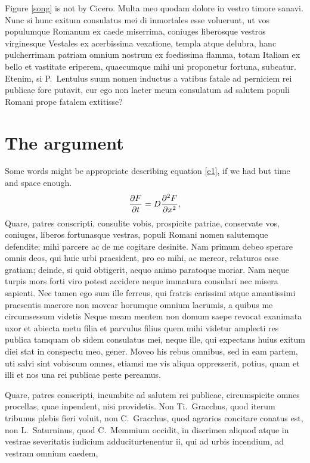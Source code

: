 \documentclass{ifacmtg}
\begin{document}
Figure \ref{song} is not by Cicero.
Multa meo quodam dolore in vestro timore sanavi. Nunc si hunc exitum
consulatus mei di inmortales esse voluerunt, ut vos populumque Romanum
ex caede miserrima, coniuges liberosque vestros virginesque Vestales ex
acerbissima vexatione, templa atque delubra, hanc pulcherrimam patriam
omnium nostrum ex foedissima flamma, totam Italiam ex bello et vastitate
eriperem, quaecumque mihi uni proponetur fortuna, subeatur. Etenim, si
P.~Lentulus suum nomen inductus a vatibus fatale ad perniciem rei
publicae fore putavit, cur ego non laeter meum consulatum ad salutem
populi Romani prope fatalem extitisse?


\section{The argument}
Some words might be appropriate describing equation \ref{e1}, if we
had but time and space enough.
\begin{equation}
{{\partial F}\over {\partial
t}}=D{{\partial^2 F}\over {\partial x^2}},
\label{e1}
\end{equation}
Quare, patres conscripti, consulite vobis, prospicite patriae,
conservate vos, coniuges, liberos fortunasque vestras, populi Romani
nomen salutemque defendite; mihi parcere ac de me cogitare desinite. Nam
primum debeo sperare omnis deos, qui huic urbi praesident, pro eo mihi,
ac mereor, relaturos esse gratiam; deinde, si quid obtigerit, aequo
animo paratoque moriar. Nam neque turpis mors forti viro potest accidere
neque immatura consulari nec misera sapienti. Nec tamen ego sum ille
ferreus, qui fratris carissimi atque amantissimi praesentis maerore non
movear horumque omnium lacrumis, a quibus me circumsessum videtis Neque
meam mentem non domum saepe revocat exanimata uxor et abiecta metu filia
et parvulus filius quem mihi videtur amplecti res publica tamquam ob
sidem consulatus mei, neque ille, qui expectans huius exitum diei stat
in conspectu meo, gener. Moveo his rebus omnibus, sed in eam partem, uti
salvi sint vobiscum omnes, etiamsi me vis aliqua oppresserit, potius,
quam et illi et nos una rei publicae peste pereamus. \par Quare, patres
conscripti, incumbite ad salutem rei publicae, circumspicite omnes
procellas, quae inpendent, nisi providetis. Non Ti.~Gracchus, quod
iterum tribunus plebis fieri voluit, non C.~Gracchus, quod agrarios
concitare conatus est, non L.~Saturninus, quod C.~Memmium occidit, in
discrimen aliquod atque in vestrae severitatis iudicium
adduciturtenentur ii, qui ad urbis incendium, ad vestram omnium caedem,
\end{document}
